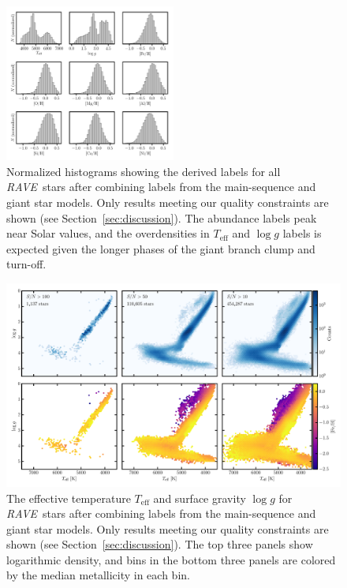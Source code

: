 \documentclass[preprint]{aastex61}
\newcommand{\acronym}[1]{{\small{#1}}}
\newcommand{\project}[1]{\textsl{#1}}
\newcommand{\rave}{\project{\acronym{RAVE}}}
\newcommand{\teff}{T_{\mathrm{eff}}}
\newcommand{\logg}{\log g}
\begin{document}
\begin{figure}[p]
\center
\includegraphics[width=0.5\textwidth]{figures/label-histograms.pdf}
\caption{Normalized histograms showing the derived labels for all \rave\ stars after combining labels from the main-sequence and giant star models. Only results meeting our quality constraints are shown (see Section~\ref{sec:discussion}). The abundance labels peak near Solar values, and the overdensities in $\teff$ and $\logg$ labels is expected given the longer phases of the giant branch clump and turn-off.\label{fig:label-histograms}}
\end{figure}


\begin{figure}[p]
\includegraphics[width=\textwidth]{figures/hrd-test-set.pdf}
\caption{The effective temperature $\teff$ and surface gravity $\logg$ for \rave\ stars after combining labels from the main-sequence and giant star models.  Only results meeting our quality constraints are shown (see Section~\ref{sec:discussion}). The top three panels show logarithmic density, and bins in the bottom three panels are colored by the median metallicity in each bin.\label{fig:test-set-hrd}}
\end{figure}
\end{document}
